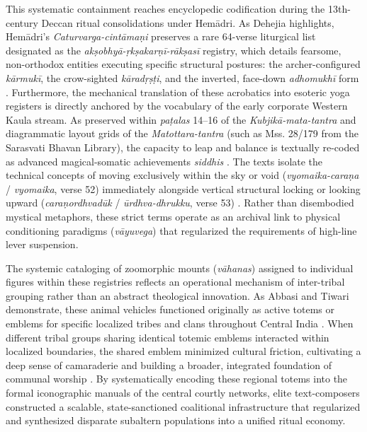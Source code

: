 \documentclass[11pt,twoside,letterpaper]{article}
\begin{document}
This systematic containment reaches encyclopedic codification during the 13th-century Deccan ritual consolidations under Hemādri. As Dehejia highlights, Hemādri’s \textit{Caturvarga-cintāmaṇi} preserves a rare 64-verse liturgical list designated as the \textit{akṣobhyā-ṛkṣakarṇī-rākṣasī} registry, which details fearsome, non-orthodox entities executing specific structural postures: the archer-configured \textit{kārmukī}, the crow-sighted \textit{kāradṛṣṭi}, and the inverted, face-down \textit{adhomukhī} form \citep{Dehejia1986}. Furthermore, the mechanical translation of these acrobatics into esoteric yoga registers is directly anchored by the vocabulary of the early corporate Western Kaula stream. As preserved within \textit{paṭalas} 14–16 of the \textit{Kubjikā-mata-tantra} and diagrammatic layout grids of the \textit{ Matottara-tantra} (such as Mss. 28/179 from the Sarasvati Bhavan Library), the capacity to leap and balance is textually re-coded as advanced magical-somatic achievements \textit{siddhis} \citep{Dehejia1986}. The texts isolate the technical concepts of moving exclusively within the sky or void (\textit{vyomaika-caraṇa} / \textit{vyomaika}, verse 52) immediately alongside vertical structural locking or looking upward (\textit{caraṇordhvadūk} / \textit{ūrdhva-dhrukku}, verse 53) \citep{Dehejia1986, Mallinson2007}. Rather than disembodied mystical metaphors, these strict terms operate as an archival link to physical conditioning paradigms (\textit{vāyuvega}) that regularized the requirements of high-line lever suspension.

The systemic cataloging of zoomorphic mounts (\textit{vāhanas}) assigned to individual figures within these registries reflects an operational mechanism of inter-tribal grouping rather than an abstract theological innovation. As Abbasi and Tiwari demonstrate, these animal vehicles functioned originally as active totems or emblems for specific localized tribes and clans throughout Central India \citep{Abbasi2001}. When different tribal groups sharing identical totemic emblems interacted within localized boundaries, the shared emblem minimized cultural friction, cultivating a deep sense of camaraderie and building a broader, integrated foundation of communal worship \citep{Abbasi2001}. By systematically encoding these regional totems into the formal iconographic manuals of the central courtly networks, elite text-composers constructed a scalable, state-sanctioned coalitional infrastructure that regularized and synthesized disparate subaltern populations into a unified ritual economy.
\end{document}
